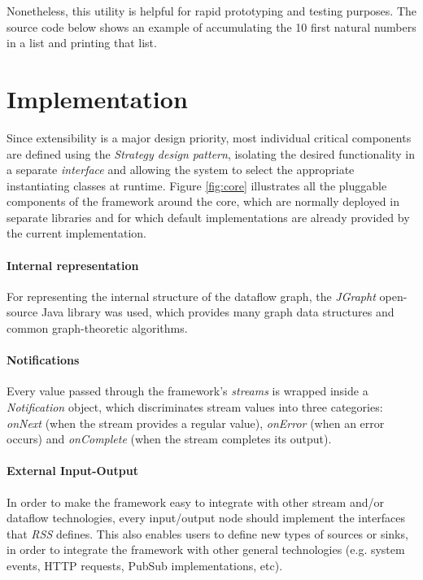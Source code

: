 \documentclass[sigplan,review,anonymous]{acmart}
\begin{document}
Nonetheless, this utility is helpful for rapid prototyping and testing purposes.
The source code below shows an example of accumulating the 10 first natural
numbers in a list and printing that list.


\section{Implementation} \label{sec:implementation}

Since extensibility is a major design priority, most individual critical
components are defined using the \textit{Strategy design pattern}, isolating the desired
functionality in a separate \textit{interface} and allowing the system to select the
appropriate instantiating classes at runtime. Figure \ref{fig:core} illustrates all the
pluggable components of the framework around the core, which are normally deployed in separate libraries
and for which default implementations are already provided by the current implementation.

\paragraph{Internal representation}
For representing the internal structure of the dataflow graph, the
\textit{JGrapht} open-source Java library was used, which provides many graph
data structures and common graph-theoretic algorithms.

\paragraph{Notifications}
Every value passed through the framework's
\textit{streams} is wrapped inside a \textit{Notification} object, which
discriminates stream values into three categories: \textit{onNext} (when the
stream provides a regular value), \textit{onError} (when an error occurs) and
\textit{onComplete} (when the stream completes its output).

\paragraph{External Input-Output}
In order to make the framework easy to integrate with other stream and/or
dataflow technologies, every input/output node should implement the
interfaces that \textit{RSS} defines. This also enables users to define new
types of sources or sinks, in order to integrate the framework with other
general technologies (e.g. system events, HTTP requests, PubSub implementations,
etc).
\end{document}
